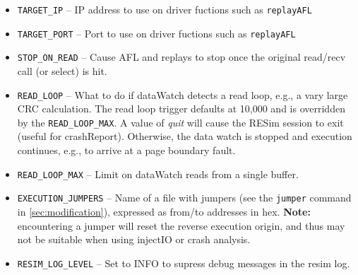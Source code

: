 \documentclass[titlepage]{article}
\begin{document}
\begin{itemize}
\item {\tt TARGET\_IP} -- IP address to use on driver fuctions such as {\tt replayAFL}
\item {\tt TARGET\_PORT} -- Port to use on driver fuctions such as {\tt replayAFL}
\item {\tt STOP\_ON\_READ} -- Cause AFL and replays to stop once the original read/recv call (or select) is hit.
\item {\tt READ\_LOOP} -- What to do if dataWatch detects a read loop, e.g., a vary large CRC calculation.  The read loop trigger defaults at 10,000
and is overridden by the {\tt READ\_LOOP\_MAX}.  A value of \textit{quit} will cause
the RESim session to exit (useful for crashReport).  Otherwise, the data watch is stopped and execution continues, e.g., to arrive at a page boundary fault.
\item {\tt READ\_LOOP\_MAX} -- Limit on dataWatch reads from a single buffer.
\item {\tt EXECUTION\_JUMPERS} -- Name of a file with jumpers (see the {\tt jumper} command in \ref{sec:modification}), expressed as 
from/to addresses in hex.  \textbf{Note:} encountering
a jumper will reset the reverse execution origin, and thus may not be suitable when using injectIO or crash analysis.
\item {\tt RESIM\_LOG\_LEVEL} -- Set to INFO to supress debug messages in the resim log.

\end{itemize}
\end{document}
